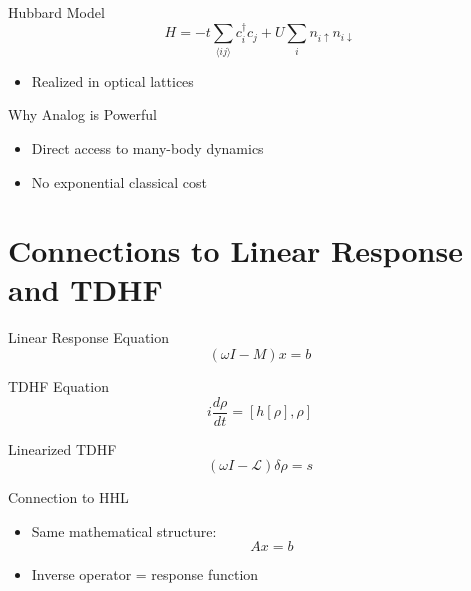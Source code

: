 \documentclass{beamer}
\begin{document}

\begin{frame}{Hubbard Model}
\[
H = -t \sum_{\langle ij\rangle} c_i^\dagger c_j
+ U \sum_i n_{i\uparrow} n_{i\downarrow}
\]
\begin{itemize}
\item Realized in optical lattices
\end{itemize}
\end{frame}


\begin{frame}{Why Analog is Powerful}
\begin{itemize}
\item Direct access to many-body dynamics
\item No exponential classical cost
\end{itemize}
\end{frame}

\section{Connections to Linear Response and TDHF}

\begin{frame}{Linear Response Equation}
\[
(\omega I - M)x = b
\]
\end{frame}


\begin{frame}{TDHF Equation}
\[
i \frac{d\rho}{dt} = [h[\rho],\rho]
\]
\end{frame}


\begin{frame}{Linearized TDHF}
\[
(\omega I - \mathcal{L})\delta\rho = s
\]
\end{frame}


\begin{frame}{Connection to HHL}
\begin{itemize}
\item Same mathematical structure:
\[
A x = b
\]
\item Inverse operator = response function
\end{itemize}
\end{frame}
\end{document}
